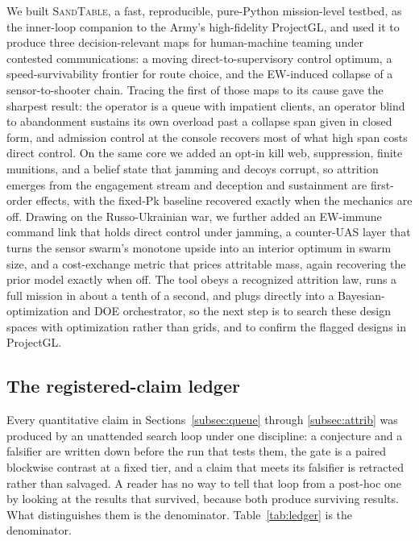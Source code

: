\documentclass[11pt]{article}
\newcommand{\sandtable}{\textsc{SandTable}}
\begin{document}
We built \sandtable{}, a fast, reproducible, pure-Python mission-level testbed, as the inner-loop companion to the Army's high-fidelity ProjectGL, and used it to produce three decision-relevant maps for human-machine teaming under contested communications: a moving direct-to-supervisory control optimum, a speed-survivability frontier for route choice, and the EW-induced collapse of a sensor-to-shooter chain. Tracing the first of those maps to its cause gave the sharpest result: the operator is a queue with impatient clients, an operator blind to abandonment sustains its own overload past a collapse span given in closed form, and admission control at the console recovers most of what high span costs direct control. On the same core we added an opt-in kill web, suppression, finite munitions, and a belief state that jamming and decoys corrupt, so attrition emerges from the engagement stream and deception and sustainment are first-order effects, with the fixed-Pk baseline recovered exactly when the mechanics are off. Drawing on the Russo-Ukrainian war, we further added an EW-immune command link that holds direct control under jamming, a counter-UAS layer that turns the sensor swarm's monotone upside into an interior optimum in swarm size, and a cost-exchange metric that prices attritable mass, again recovering the prior model exactly when off. The tool obeys a recognized attrition law, runs a full mission in about a tenth of a second, and plugs directly into a Bayesian-optimization and DOE orchestrator, so the next step is to search these design spaces with optimization rather than grids, and to confirm the flagged designs in ProjectGL.

\subsection{The registered-claim ledger}
\label{subsec:ledger}

Every quantitative claim in Sections~\ref{subsec:queue} through \ref{subsec:attrib} was produced by an unattended search loop under one discipline: a conjecture and a falsifier are written down before the run that tests them, the gate is a paired blockwise contrast at a fixed tier, and a claim that meets its falsifier is retracted rather than salvaged. A reader has no way to tell that loop from a post-hoc one by looking at the results that survived, because both produce surviving results. What distinguishes them is the denominator. Table~\ref{tab:ledger} is the denominator.
\end{document}
